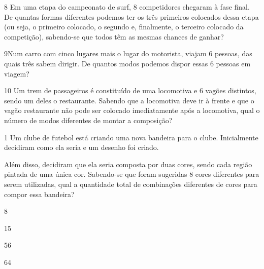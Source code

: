 

\num{8} Em uma etapa do campeonato de surf, 8 competidores chegaram à fase
final. De quantas formas diferentes podemos ter os três primeiros
colocados dessa etapa (ou seja, o primeiro colocado, o segundo e,
finalmente, o terceiro colocado da competição), sabendo-se que todos
têm as mesmas chances de ganhar?



\num{9}Num carro com cinco lugares mais o lugar do motorista, viajam 6
pessoas, das quais três sabem dirigir. De quantos modos podemos dispor
essas 6 pessoas em viagem?



\num{10} Um trem de passageiros é constituído de uma locomotiva e 6 vagões
distintos, sendo um deles o restaurante. Sabendo que a locomotiva deve ir
à frente e que o vagão restaurante não pode ser colocado imediatamente
após a locomotiva, qual o número de modos diferentes de montar a composição?




\num{1} Um clube de futebol está criando uma nova bandeira para o clube.
Inicialmente decidiram como ela seria e um desenho foi criado.


Além disso, decidiram que ela seria composta por duas cores, sendo cada
região pintada de uma única cor. Sabendo-se que foram sugeridas 8 cores
diferentes para serem utilizadas, qual a quantidade total de combinações
diferentes de cores para compor essa bandeira?

\begin{escolha}
\item
  8
\item
  15
\item
  56
\item
  64
\end{escolha}

